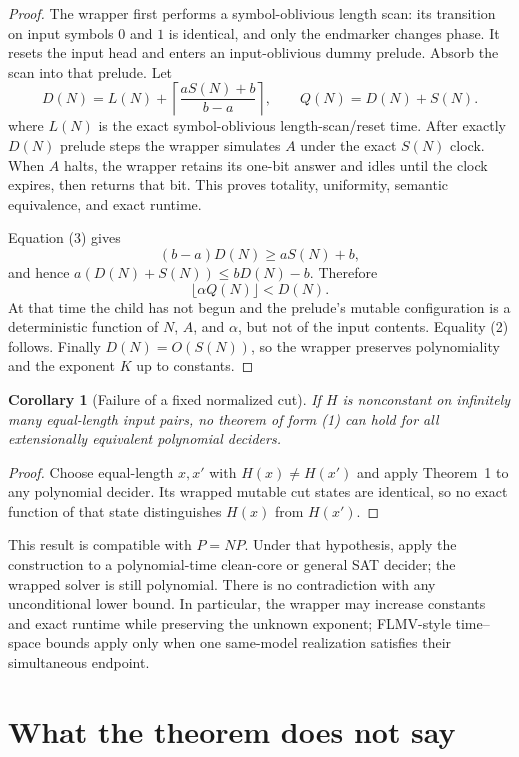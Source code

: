 \documentclass[11pt]{article}
\newtheorem{corollary}[theorem]{Corollary}
\begin{document}
\begin{proof}
The wrapper first performs a symbol-oblivious length scan: its transition on
input symbols $0$ and $1$ is identical, and only the endmarker changes phase.
It resets the input head and enters an input-oblivious dummy prelude.  Absorb
the scan into that prelude.  Let
\[
 D(N)=L(N)+\left\lceil\frac{aS(N)+b}{b-a}\right\rceil,
 \qquad Q(N)=D(N)+S(N).                                  \tag{3}
\]
where $L(N)$ is the exact symbol-oblivious length-scan/reset time.  After
exactly $D(N)$ prelude steps the wrapper simulates $A$ under the exact
$S(N)$ clock.  When $A$ halts, the wrapper retains its one-bit answer and idles
until the clock expires, then returns that bit.  This proves totality,
uniformity, semantic equivalence, and exact runtime.

Equation (3) gives
\[
 (b-a)D(N)\ge aS(N)+b,
\]
and hence $a(D(N)+S(N))\le bD(N)-b$.  Therefore
\[
 \lfloor\alpha Q(N)\rfloor <D(N).                       \tag{4}
\]
At that time the child has not begun and the prelude's mutable configuration
is a deterministic function of $N$, $A$, and $\alpha$, but not of the input
contents.  Equality (2) follows.  Finally $D(N)=O(S(N))$, so the wrapper
preserves polynomiality and the exponent $K$ up to constants.
\end{proof}

\begin{corollary}[Failure of a fixed normalized cut]
If $H$ is nonconstant on infinitely many equal-length input pairs, no theorem
of form (1) can hold for all extensionally equivalent polynomial deciders.
\end{corollary}
\begin{proof}
Choose equal-length $x,x'$ with $H(x)\ne H(x')$ and apply Theorem~1 to any
polynomial decider.  Its wrapped mutable cut states are identical, so no exact
function of that state distinguishes $H(x)$ from $H(x')$.
\end{proof}

This result is compatible with $P=NP$.  Under that hypothesis, apply the
construction to a polynomial-time clean-core or general SAT decider; the
wrapped solver is still polynomial.  There is no contradiction with any
unconditional lower bound.  In particular, the wrapper may increase constants
and exact runtime while preserving the unknown exponent; FLMV-style
time--space bounds apply only when one same-model realization satisfies their
simultaneous endpoint.

\section{What the theorem does not say}
\end{document}
